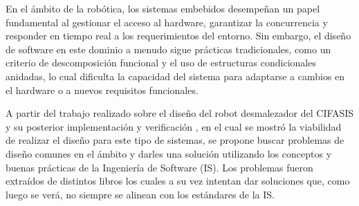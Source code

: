 %
%

En el ámbito de la robótica, los sistemas embebidos desempeñan un papel fundamental al gestionar el acceso al hardware, garantizar la concurrencia y responder en tiempo real a los requerimientos del entorno. Sin embargo, el diseño de software en este dominio a menudo sigue prácticas tradicionales, como un criterio de descomposición funcional y el uso de estructuras condicionales anidadas, lo cual dificulta la capacidad del sistema para adaptarse a cambios en el hardware o a nuevos requisitos funcionales.

A partir del trabajo realizado sobre el diseño del robot desmalezador del CIFASIS y su posterior implementación y verificación \cite{paperPomponio}, en el cual se mostró la viabilidad de realizar el diseño para este tipo de sistemas, se propone buscar problemas de diseño comunes en el ámbito y darles una solución utilizando los conceptos y buenas prácticas de la Ingeniería de Software (IS). Los problemas fueron extraídos de distintos libros \cite{douglass}\cite{elecia} los cuales a su vez intentan dar soluciones que, como luego se verá, no siempre se alinean con los estándares de la IS.
